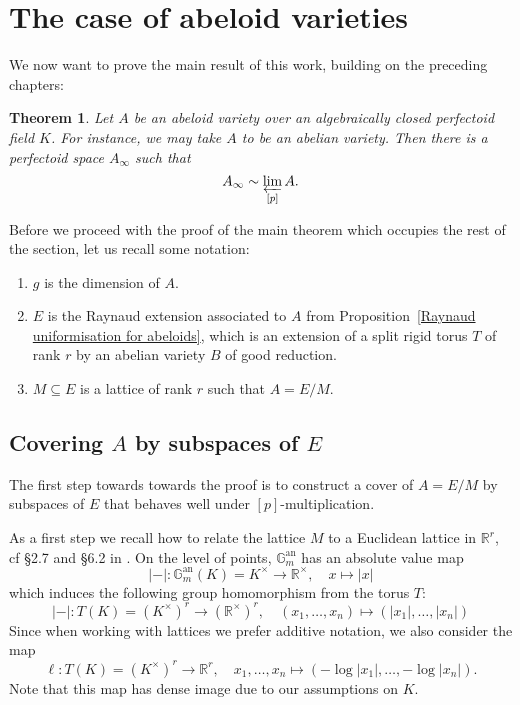 \documentclass[10pt,oneside]{amsart}
\newtheorem{theorem}{Theorem}[section]
\theoremstyle{definition}
\begin{document}
	
	\section{The case of abeloid varieties}\label{The case of abeloid varieties}
	We now want to prove the main result of this work, building on the preceding chapters:
	
	\begin{theorem}\label{main theorem}
		Let $A$ be an abeloid variety over an algebraically closed perfectoid field $K$. For instance, we may take $A$ to be an abelian variety. Then there is a perfectoid space $A_\infty$ such that
				\[A_\infty \sim \varprojlim_{[p]} A.\]
	\end{theorem} 

Before we proceed with the proof of the main theorem which occupies the rest of the section, let us recall some notation:

\begin{enumerate} 
\item  $g$ is the dimension of $A$. 
\item  $E$ is the Raynaud extension associated to $A$ from Proposition~\ref{Raynaud uniformisation for abeloids}, which is an extension of a split rigid torus $T$ of rank $r$ by an abelian variety $B$ of good reduction. 
\item $M\subseteq E$  is a lattice of rank $r$ such that $A=E/M$. 
\end{enumerate}

	
	\subsection{Covering $A$ by subspaces of $E$}
		The first step towards towards the proof is to construct a cover of $A = E/M$ by subspaces of $E$ that behaves well under $[p]$-multiplication.
	
	As a first step we recall how to relate the lattice $M$ to a Euclidean lattice in $\mathbb R^r$, cf \S2.7 and \S6.2 in  \cite{rigid geometry of curves}. On the level of points, $\mathbb{G}_m^{\operatorname{an}}$ has an absolute value map
	\[|-|:\mathbb{G}_m^{\operatorname{an}}(K)=K^\times\rightarrow \mathbb R^\times, \quad x\mapsto |x|\]
	which induces the following group homomorphism from the torus $T$:
	\[|-|:T(K)=(K^\times)^r\rightarrow (\mathbb R^\times)^r, \quad (x_1,\dots,x_n)\mapsto (|x_1|,\dots,|x_n|)\]
	Since when working with lattices we prefer additive notation, we also consider the map
	\[\ell:T(K)=(K^\times)^r\rightarrow \mathbb R^r, \quad x_1,\dots,x_n\mapsto (-\log |x_1|,\dots,-\log |x_n|).\]
	Note that this map has dense image due to our assumptions on $K$.
	
\end{document}
